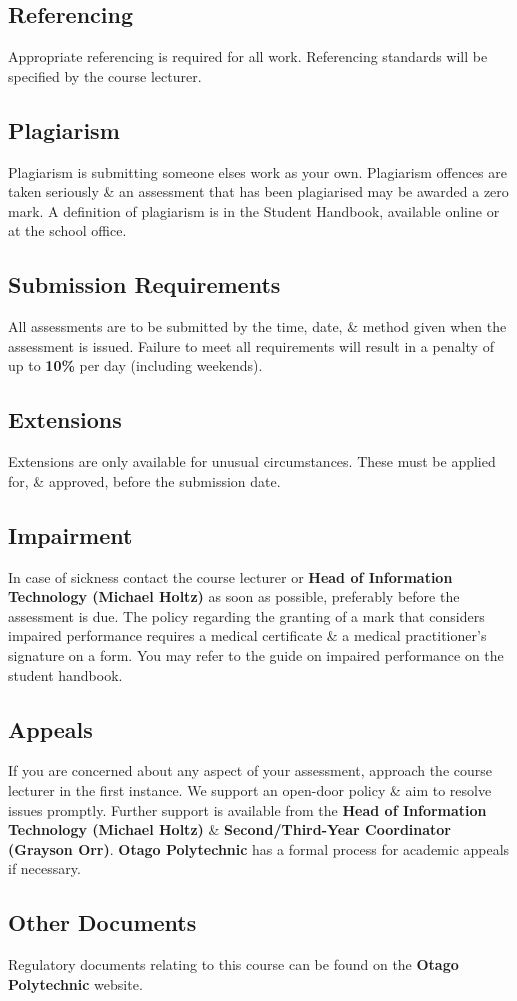 \documentclass{article}
\begin{document}
\subsection*{Referencing}
Appropriate referencing is required for all work. Referencing standards will be specified by the course lecturer.

\subsection*{Plagiarism}
Plagiarism is submitting someone elses work as your own. Plagiarism offences are taken seriously \& an assessment that has been plagiarised may be awarded a zero mark. A definition of plagiarism is in the Student Handbook, available online or at the school office.

\subsection*{Submission Requirements}
All assessments are to be submitted by the time, date, \& method given when the assessment is issued. Failure to meet all requirements will result in a penalty of up to \textbf{10\%} per day (including weekends).

\subsection*{Extensions}
Extensions are only available for unusual circumstances. These must be applied for, \& approved, before the submission date.

\subsection*{Impairment}
In case of sickness contact the course lecturer or \textbf{Head of Information Technology (Michael Holtz)} as soon as possible, preferably before the assessment is due. The policy regarding the granting of a mark that considers impaired performance requires a medical certificate \& a medical practitioner’s signature on a form. You may refer to the guide on impaired performance on the student handbook.

\subsection*{Appeals}
If you are concerned about any aspect of your assessment, approach the course lecturer in the first instance. We support an open-door policy \& aim to resolve issues promptly. Further support is available from the \textbf{Head of Information Technology (Michael Holtz)} \& \textbf{Second/Third-Year Coordinator (Grayson Orr)}. \textbf{Otago Polytechnic} has a formal process for academic appeals if necessary.

\subsection*{Other Documents}
Regulatory documents relating to this course can be found on the \textbf{Otago Polytechnic} website.
\end{document}
